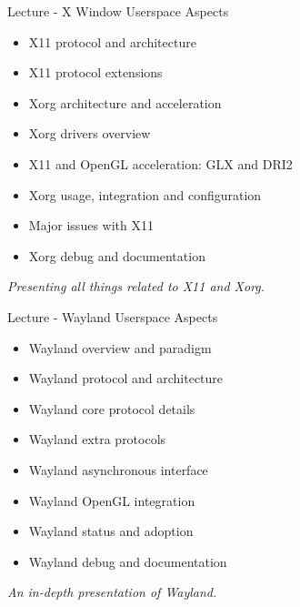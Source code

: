 \documentclass[a4paper,12pt,obeyspaces,spaces,hyphens]{article}
\begin{document}
\feagendatwocolumn
{Lecture - X Window Userspace Aspects}
{
  \begin{itemize}
  \item X11 protocol and architecture
  \item X11 protocol extensions
  \item Xorg architecture and acceleration
  \item Xorg drivers overview
  \item X11 and OpenGL acceleration: GLX and DRI2
  \item Xorg usage, integration and configuration
  \item Major issues with X11
  \item Xorg debug and documentation
  \end{itemize}
  \vspace{0.5em}
  {\em Presenting all things related to X11 and Xorg.}
}
{Lecture - Wayland Userspace Aspects}
{
  \begin{itemize}
  \item Wayland overview and paradigm
  \item Wayland protocol and architecture
  \item Wayland core protocol details
  \item Wayland extra protocols
  \item Wayland asynchronous interface
  \item Wayland OpenGL integration
  \item Wayland status and adoption
  \item Wayland debug and documentation
  \end{itemize}
  \vspace{0.5em}
  {\em An in-depth presentation of Wayland.}
}\\
\end{document}
